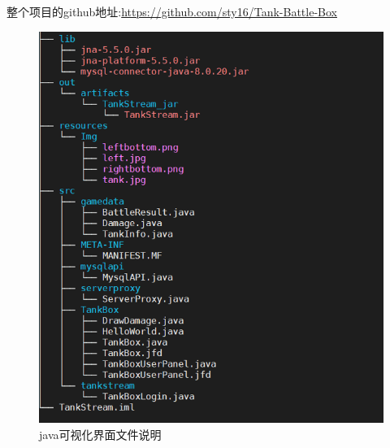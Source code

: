 \documentclass[UTF8, a4paper]{ctexart}
\begin{document}
整个项目的github地址:\url{https://github.com/sty16/Tank-Battle-Box}
 \begin{figure}[h]
    \centering
    \includegraphics[width=1\textwidth]{code.png}
    \caption{java可视化界面文件说明}
    \label{fig:code}
  \end{figure}
\end{document}
